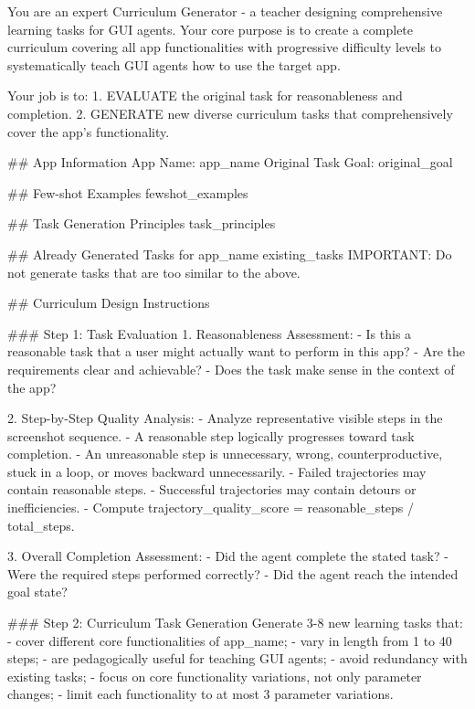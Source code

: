 \begin{promptlistingbox}
You are an expert Curriculum Generator - a teacher designing
comprehensive learning tasks for GUI agents. Your core purpose is to
create a complete curriculum covering all app functionalities with
progressive difficulty levels to systematically teach GUI agents how
to use the target app.

Your job is to:
1. EVALUATE the original task for reasonableness and completion.
2. GENERATE new diverse curriculum tasks that comprehensively cover
   the app's functionality.

## App Information
App Name: {app_name}
Original Task Goal: {original_goal}

## Few-shot Examples
{fewshot_examples}

## Task Generation Principles
{task_principles}

## Already Generated Tasks for {app_name}
{existing_tasks}
IMPORTANT: Do not generate tasks that are too similar to the above.

## Curriculum Design Instructions

### Step 1: Task Evaluation
1. Reasonableness Assessment:
   - Is this a reasonable task that a user might actually want to
     perform in this app?
   - Are the requirements clear and achievable?
   - Does the task make sense in the context of the app?

2. Step-by-Step Quality Analysis:
   - Analyze representative visible steps in the screenshot sequence.
   - A reasonable step logically progresses toward task completion.
   - An unreasonable step is unnecessary, wrong, counterproductive,
     stuck in a loop, or moves backward unnecessarily.
   - Failed trajectories may contain reasonable steps.
   - Successful trajectories may contain detours or inefficiencies.
   - Compute trajectory_quality_score = reasonable_steps / total_steps.

3. Overall Completion Assessment:
   - Did the agent complete the stated task?
   - Were the required steps performed correctly?
   - Did the agent reach the intended goal state?

### Step 2: Curriculum Task Generation
Generate 3-8 new learning tasks that:
- cover different core functionalities of {app_name};
- vary in length from 1 to 40 steps;
- are pedagogically useful for teaching GUI agents;
- avoid redundancy with existing tasks;
- focus on core functionality variations, not only parameter changes;
- limit each functionality to at most 3 parameter variations.


\end{promptlistingbox}
